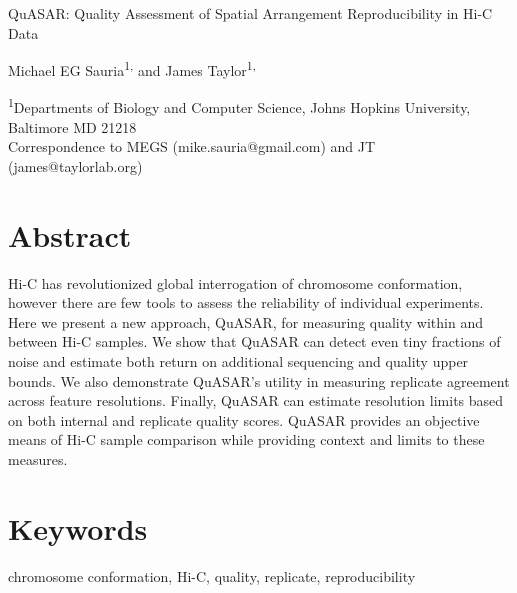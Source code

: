 \documentclass[letterpaper,11pt,english]{article}
\begin{document}
{\sffamily

{\fontsize{16pt}{16pt}\selectfont QuASAR: Quality Assessment of Spatial Arrangement Reproducibility in Hi-C Data}

\vspace{1em}

Michael EG Sauria\textsuperscript{1,\dagger} and James Taylor\textsuperscript{1,\dagger}

\vspace{0.5em}

\textsuperscript{1}Departments of Biology and Computer Science, Johns Hopkins University, Baltimore MD 21218 \\
\textsuperscript{\dagger}Correspondence to MEGS (mike.sauria@gmail.com) and JT (james@taylorlab.org)

}

\section{Abstract}

Hi-C has revolutionized global interrogation of chromosome conformation, however there are few tools to assess the reliability of individual experiments. Here we present a new approach, QuASAR, for measuring quality within and between Hi-C samples. We show that QuASAR can detect even tiny fractions of noise and estimate both return on additional sequencing and quality upper bounds. We also demonstrate QuASAR’s utility in measuring replicate agreement across feature resolutions. Finally, QuASAR can estimate resolution limits based on both internal and replicate quality scores. QuASAR provides an objective means of Hi-C sample comparison while providing context and limits to these measures.

\section{Keywords}
chromosome conformation, Hi-C, quality, replicate, reproducibility %

\clearpage


\end{document}
